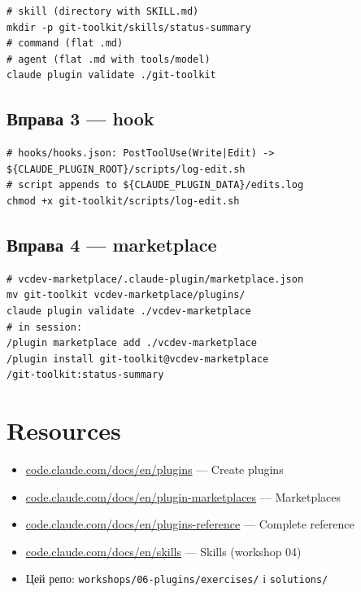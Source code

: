 \documentclass[11pt,a4paper]{article}
\begin{document}
\begin{lstlisting}
# skill (directory with SKILL.md)
mkdir -p git-toolkit/skills/status-summary
# command (flat .md)
# agent (flat .md with tools/model)
claude plugin validate ./git-toolkit
\end{lstlisting}

\subsection{Вправа 3 --- hook}

\begin{lstlisting}
# hooks/hooks.json: PostToolUse(Write|Edit) -> ${CLAUDE_PLUGIN_ROOT}/scripts/log-edit.sh
# script appends to ${CLAUDE_PLUGIN_DATA}/edits.log
chmod +x git-toolkit/scripts/log-edit.sh
\end{lstlisting}

\subsection{Вправа 4 --- marketplace}

\begin{lstlisting}
# vcdev-marketplace/.claude-plugin/marketplace.json
mv git-toolkit vcdev-marketplace/plugins/
claude plugin validate ./vcdev-marketplace
# in session:
/plugin marketplace add ./vcdev-marketplace
/plugin install git-toolkit@vcdev-marketplace
/git-toolkit:status-summary
\end{lstlisting}

\section{Resources}

\begin{itemize}
\item \href{https://code.claude.com/docs/en/plugins}{code.claude.com/docs/en/plugins} --- Create plugins
\item \href{https://code.claude.com/docs/en/plugin-marketplaces}{code.claude.com/docs/en/plugin-marketplaces} --- Marketplaces
\item \href{https://code.claude.com/docs/en/plugins-reference}{code.claude.com/docs/en/plugins-reference} --- Complete reference
\item \href{https://code.claude.com/docs/en/skills}{code.claude.com/docs/en/skills} --- Skills (workshop 04)
\item Цей репо: \texttt{workshops/06-plugins/exercises/} і \texttt{solutions/}
\end{itemize}
\end{document}

